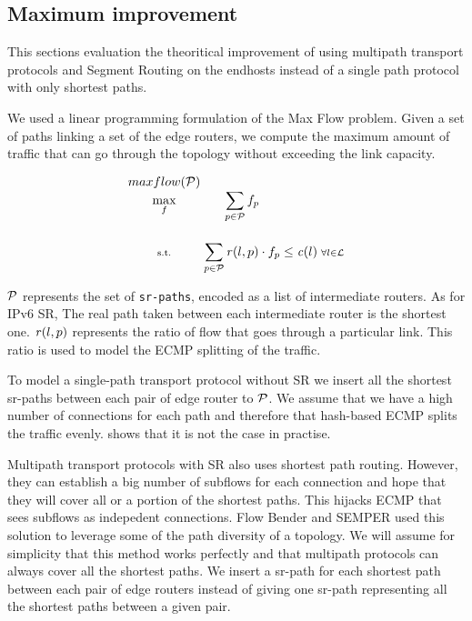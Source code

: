 \subsection{Maximum improvement}

This sections evaluation the theoritical improvement of using
multipath transport protocols and Segment Routing on the endhosts
instead of a single path protocol with only shortest paths.

We used a linear programming formulation of the Max Flow problem.
Given a set of paths linking a set of the edge routers, we compute
the maximum amount of traffic that can go through the topology without
exceeding the link capacity.

\begin{equation*}
	\setlength\arraycolsep{0.2pt}
	\begin{smallmatrix}
		\displaystyle maxflow(\P) & & \\
		\displaystyle \max_{f} & \displaystyle \sum_{p \in \P} f_{p} & \\[0.5cm]
		\textrm{s.t.}          & \displaystyle \sum_{p \in \P} \r(l, p) \cdot f_{p} & \displaystyle \leq & \displaystyle \cap(l) & \forall l \in \L
	\end{smallmatrix}
\end{equation*}

$\P$ represents the set of \texttt{sr-paths}, encoded as a list of intermediate routers.
As for IPv6 SR, The real path taken between each intermediate router is the shortest one.
$\r(l, p)$ represents the ratio of flow that goes through a particular link.
This ratio is used to model the ECMP splitting of the traffic.

To model a single-path transport protocol without SR
we insert all the shortest sr-paths between each pair of edge router to $\P$.
We assume that we have a high number of connections for each path
and therefore that hash-based ECMP splits the traffic evenly.
\cite{ecmphashperf} shows that it is not the case in practise.

Multipath transport protocols with SR also uses shortest path routing.
However, they can establish a big number of subflows for each connection
and hope that they will cover all or a portion of the shortest paths.
This hijacks ECMP that sees subflows as indepedent connections.
Flow Bender and SEMPER used this solution to leverage
some of the path diversity of a topology.
We will assume for simplicity that this method works perfectly and that multipath protocols
can always cover all the shortest paths.
We insert a sr-path for each shortest path between each pair of edge routers
instead of giving one sr-path representing all the shortest paths between a given pair. 

